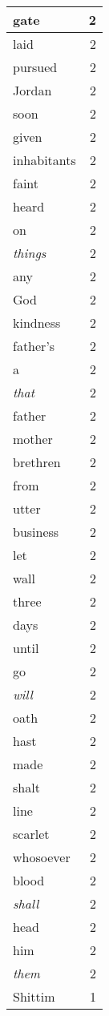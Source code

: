 \begin{center}
\begin{longtable}{l|r}
gate & 2 \\ \hline
laid & 2 \\ \hline
pursued & 2 \\ \hline
Jordan & 2 \\ \hline
soon & 2 \\ \hline
given & 2 \\ \hline
inhabitants & 2 \\ \hline
faint & 2 \\ \hline
heard & 2 \\ \hline
on & 2 \\ \hline
\emph{things} & 2 \\ \hline
any & 2 \\ \hline
God & 2 \\ \hline
kindness & 2 \\ \hline
father's & 2 \\ \hline
a & 2 \\ \hline
\emph{that} & 2 \\ \hline
father & 2 \\ \hline
mother & 2 \\ \hline
brethren & 2 \\ \hline
from & 2 \\ \hline
utter & 2 \\ \hline
business & 2 \\ \hline
let & 2 \\ \hline
wall & 2 \\ \hline
three & 2 \\ \hline
days & 2 \\ \hline
until & 2 \\ \hline
go & 2 \\ \hline
\emph{will} & 2 \\ \hline
oath & 2 \\ \hline
hast & 2 \\ \hline
made & 2 \\ \hline
shalt & 2 \\ \hline
line & 2 \\ \hline
scarlet & 2 \\ \hline
whosoever & 2 \\ \hline
blood & 2 \\ \hline
\emph{shall} & 2 \\ \hline
head & 2 \\ \hline
him & 2 \\ \hline
\emph{them} & 2 \\ \hline
Shittim & 1 \\ \hline

\end{longtable}
\end{center}
